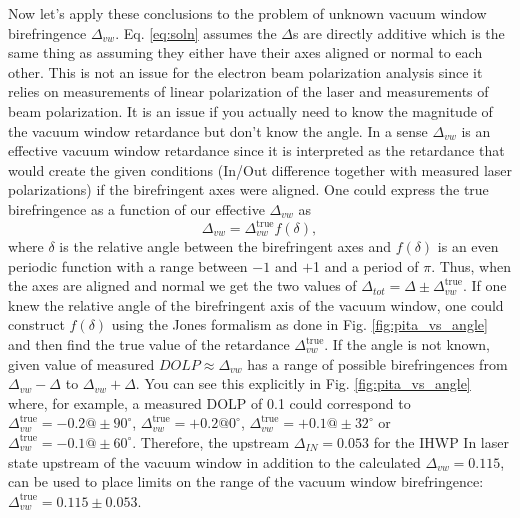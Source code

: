 \documentclass[12pt]{article}
\begin{document}
Now let's apply these conclusions to the problem of unknown vacuum window birefringence $\Delta_{vw}$. Eq. \ref{eq:soln} assumes the $\Delta$s are directly additive which is the same thing as assuming they either have their axes aligned or normal to each other. This is not an issue for the electron beam polarization analysis since it relies on measurements of linear polarization of the laser and measurements of beam polarization. It is an issue if you actually need to know the magnitude of the vacuum window retardance but don't know the angle. In a sense $\Delta_{vw}$ is an effective vacuum window retardance since it is interpreted as the retardance that would create the given conditions (In/Out difference together with measured laser polarizations) if the birefringent axes were aligned. One could express the true birefringence as a function of our effective $\Delta_{vw}$ as 
\[
\Delta_{vw}=\Delta^{\textrm{true}}_{vw}f(\delta),
\]
where $\delta$ is the relative angle between the birefringent axes and $f(\delta)$ is an even periodic function with a range between $-1$ and $+$1 and a period of $\pi$. Thus, when the axes are aligned and normal we get the two values of $\Delta_{tot}=\Delta\pm\Delta^{\textrm{true}}_{vw}$.  If one knew the relative angle of the birefringent axis of the vacuum window, one could construct $f(\delta)$ using the Jones formalism as done in Fig. \ref{fig:pita_vs_angle} and then find the true value of the retardance $\Delta^{\textrm{true}}_{vw}$. If the angle is not known, given value of measured $DOLP\approx\Delta_{vw}$ has a range of possible birefringences from $\Delta_{vw}-\Delta$ to $\Delta_{vw}+\Delta$. You can see this explicitly in Fig. \ref{fig:pita_vs_angle} where, for example, a measured DOLP of 0.1 could correspond to $\Delta^{\textrm{true}}_{vw}=-0.2@\pm90^{\circ}$, $\Delta^{\textrm{true}}_{vw}=+0.2@0^{\circ}$, $\Delta^{\textrm{true}}_{vw}=+0.1@\pm32^{\circ}$ or $\Delta^{\textrm{true}}_{vw}=-0.1@\pm60^{\circ}$. Therefore, the upstream $\Delta_{IN}=0.053$ for the IHWP In laser state upstream of the vacuum window in addition to the calculated $\Delta_{vw}=0.115$, can be used to place limits on the range of the vacuum window birefringence: $\Delta^{\textrm{true}}_{vw}=0.115\pm0.053$. 
\newpage

%


\end{document}
